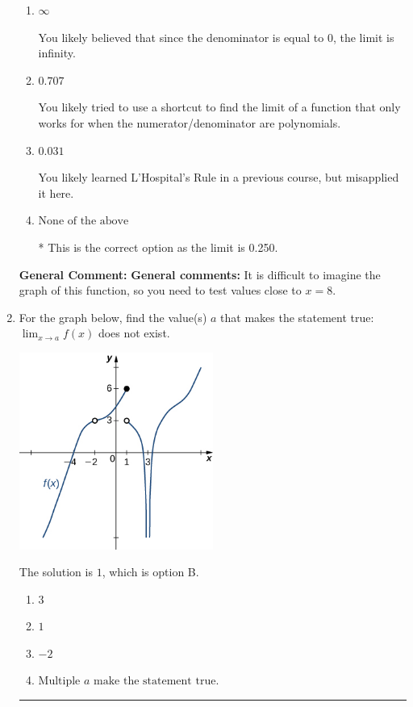 \documentclass{extbook}[14pt]
\newcommand{\litem}[1]{\item #1

\rule{\textwidth}{0.4pt}}
\begin{document}
\begin{enumerate}
{\begin{enumerate}[label=\Alph*.]
You likely memorized how to solve the similar homework problem and used the same formula here.
\item \( \infty \)

You likely believed that since the denominator is equal to 0, the limit is infinity.
\item \( 0.707 \)

You likely tried to use a shortcut to find the limit of a function that only works for when the numerator/denominator are polynomials.
\item \( 0.031 \)

You likely learned L'Hospital's Rule in a previous course, but misapplied it here.
\item \( \text{None of the above} \)

* This is the correct option as the limit is 0.250.
\end{enumerate}

\textbf{General Comment:} \textbf{General comments:} It is difficult to imagine the graph of this function, so you need to test values close to $x = 8$.
}
\litem{
For the graph below, find the value(s) $a$ that makes the statement true: $ \displaystyle \lim_{x \rightarrow a} f(x)$ does not exist.

\begin{center}
    \includegraphics[width=0.5\textwidth]{../Figures/evaluateLimitGraphicallyC.png}
\end{center}


The solution is \( 1 \), which is option B.\begin{enumerate}[label=\Alph*.]
\item \( 3 \)


\item \( 1 \)


\item \( -2 \)


\item \( \text{Multiple } a \text{ make the statement true}. \)



\end{enumerate}}
\end{enumerate}
\end{document}
